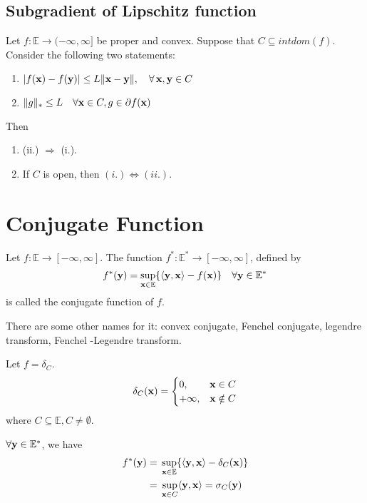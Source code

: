 \documentclass[11pt]{article}
\begin{document}
\subsection{Subgradient of Lipschitz function}
\begin{theorem}
    Let $f: \mathbb{E} \to (-\infty,\infty]$ be proper and convex. Suppose that $C \subseteq intdom(f)$.
    Consider the following two statements:
    \begin{enumerate}
        \item $|f({\mathbf{x}}) - f({\mathbf{y}})| \le L\| {\mathbf{x}} - {\mathbf{y}} \|, \quad \forall \, {\mathbf{x}}, {\mathbf{y}} \in C$
        \item $\| g \|_{*} \le L\quad \forall {\mathbf{x}} \in C, g \in \partial f({\mathbf{x}})$
    \end{enumerate}
    Then
    \begin{enumerate}
        \item (ii.) $\Longrightarrow$ (i.).
        \item If $C$ is open, then $(i.) \iff (ii.)$.
    \end{enumerate}
\end{theorem}





\section{Conjugate Function}
\begin{definition}
    Let $f: \mathbb{E} \to [-\infty,\infty]$. The function $f^{*}: \mathbb{E}^{*} \to [-\infty,\infty]$,
    defined by 
    \begin{align*}
        f^{*}({\mathbf{y}}) = \sup_{{\mathbf{x}} \in \mathbb{E}}\{ \langle {\mathbf{y}},{\mathbf{x}} \rangle - f({\mathbf{x}}) \} \quad \forall {\mathbf{y}} \in \mathbb{E}^{*}
    \end{align*}
    is called the conjugate function of $f$.
\end{definition}
\begin{remark}
    There are some other names for it: convex conjugate, Fenchel conjugate, legendre transform, Fenchel
    -Legendre transform.
\end{remark}

\begin{example}
    Let $f = \delta_{C}$.
    \begin{equation} \delta_{C}({\mathbf{x}}) = 
        \begin{cases} 
        0, & {\mathbf{x}}  \in C  \\ 
        +\infty, & {\mathbf{x}}  \notin C 
        \end{cases}
    \end{equation}
    where $C \subseteq  \mathbb{E}, C \neq \emptyset$.

    $\forall {\mathbf{y}} \in \mathbb{E}^{*}$, we have
    \begin{align*}
        f^{*}({\mathbf{y}}) =\;& \sup_{{\mathbf{x}} \in \mathbb{E}}\{ \langle {\mathbf{y}},{\mathbf{x}} \rangle - \delta_{C}({\mathbf{x}}) \}\\
        = \;& \sup_{{\mathbf{x}} \in C}\langle {\mathbf{y}},{\mathbf{x}} \rangle = \sigma_{C}({\mathbf{y}})
    \end{align*}
\end{example}
\end{document}
